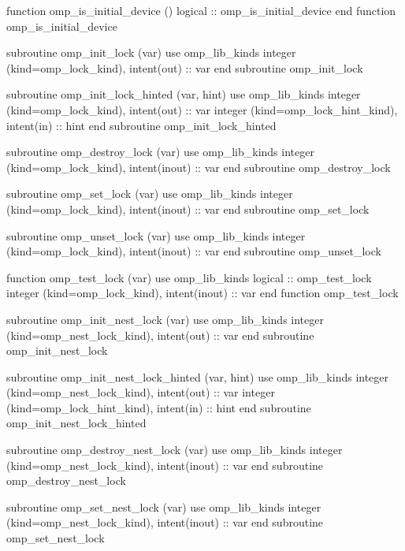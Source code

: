 {\begin{codepar}
          function omp\_is\_initial\_device ()
           logical :: omp\_is\_initial\_device
          end function omp\_is\_initial\_device

          subroutine omp\_init\_lock (var)
           use omp\_lib\_kinds
           integer (kind=omp\_lock\_kind), intent(out) :: var
          end subroutine omp\_init\_lock

          subroutine omp\_init\_lock\_hinted (var, hint)
           use omp\_lib\_kinds
           integer (kind=omp\_lock\_kind), intent(out) :: var
           integer (kind=omp\_lock\_hint\_kind), intent(in) :: hint
          end subroutine omp\_init\_lock\_hinted

          subroutine omp\_destroy\_lock (var)
           use omp\_lib\_kinds
           integer (kind=omp\_lock\_kind), intent(inout) :: var
          end subroutine omp\_destroy\_lock

          subroutine omp\_set\_lock (var)
           use omp\_lib\_kinds
           integer (kind=omp\_lock\_kind), intent(inout) :: var
          end subroutine omp\_set\_lock

          subroutine omp\_unset\_lock (var)
           use omp\_lib\_kinds
           integer (kind=omp\_lock\_kind), intent(inout) :: var
          end subroutine omp\_unset\_lock

          function omp\_test\_lock (var)
           use omp\_lib\_kinds
           logical :: omp\_test\_lock
           integer (kind=omp\_lock\_kind), intent(inout) :: var
          end function omp\_test\_lock

          subroutine omp\_init\_nest\_lock (var)
           use omp\_lib\_kinds
           integer (kind=omp\_nest\_lock\_kind), intent(out) :: var
          end subroutine omp\_init\_nest\_lock

          subroutine omp\_init\_nest\_lock\_hinted (var, hint)
           use omp\_lib\_kinds
           integer (kind=omp\_nest\_lock\_kind), intent(out) :: var
           integer (kind=omp\_lock\_hint\_kind), intent(in) :: hint
          end subroutine omp\_init\_nest\_lock\_hinted

          subroutine omp\_destroy\_nest\_lock (var)
           use omp\_lib\_kinds
           integer (kind=omp\_nest\_lock\_kind), intent(inout) :: var
          end subroutine omp\_destroy\_nest\_lock

          subroutine omp\_set\_nest\_lock (var)
           use omp\_lib\_kinds
           integer (kind=omp\_nest\_lock\_kind), intent(inout) :: var
          end subroutine omp\_set\_nest\_lock


\end{codepar}}
